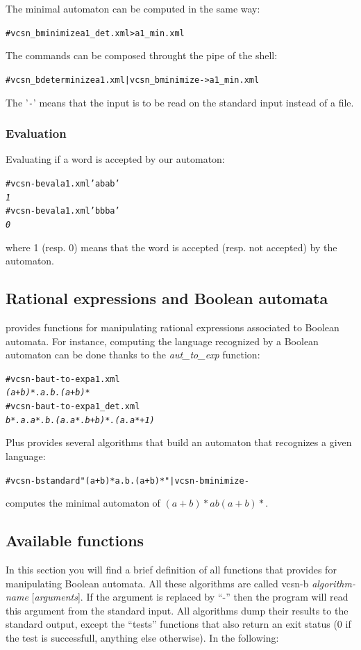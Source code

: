 The minimal automaton can be computed in the same way:
\begin{alltt}
# vcsn_b minimize a1_det.xml > a1_min.xml
\end{alltt}
The commands can be composed throught the pipe of the shell:
\begin{alltt}
# vcsn_b determinize a1.xml | vcsn_b minimize - > a1_min.xml
\end{alltt}
The '{\tt -}' means that the input is to be read on the standard
input instead of a file.

\subsubsection{Evaluation}

Evaluating if a word is accepted by our automaton:
\begin{alltt}
# vcsn-b eval a1.xml 'abab'
\textit{1}
# vcsn-b eval a1.xml 'bbba'
\textit{0}
\end{alltt}
where 1 (resp. 0) means that the word is accepted (resp. not accepted)
by the automaton.

\subsection{Rational expressions and Boolean automata}

\Vauc provides functions for manipulating rational expressions
associated to Boolean automata. For instance, computing the language
recognized by a Boolean automaton can be done thanks to the
\textit{aut\_to\_exp} function:
\begin{alltt}
# vcsn-b aut-to-exp a1.xml
\textit{(a+b)*.a.b.(a+b)*}
# vcsn-b aut-to-exp a1_det.xml
\textit{b*.a.a*.b.(a.a*.b+b)*.(a.a*+1)}
\end{alltt}
Plus \Vauc provides several algorithms that build an automaton that
recognizes a given language:
\begin{alltt}
# vcsn-b standard "(a+b)*a.b.(a+b)*" | vcsn-b minimize -
\end{alltt}
computes the minimal automaton of $(a+b)*ab(a+b)*$.

\subsection{Available functions}
In this section you will find a brief definition of all functions that
\Vauc provides for manipulating Boolean automata. All these algorithms
are called vcsn-b \textit{algorithm-name} [\textit{arguments}]. If the
argument is replaced by ``-'' then the program will read this argument
from the standard input. All algorithms dump their results to the
standard output, except the ``tests'' functions that also return an
exit status (0 if the test is successfull, anything else otherwise).
In the following:

